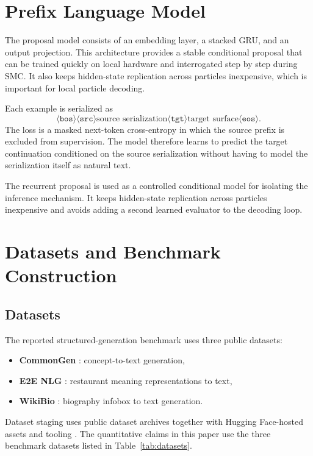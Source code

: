 \documentclass[11pt]{article}
\begin{document}
\section{Prefix Language Model}
The proposal model consists of an embedding layer, a stacked GRU, and an output projection. This architecture provides a stable conditional proposal that can be trained quickly on local hardware and interrogated step by step during SMC. It also keeps hidden-state replication across particles inexpensive, which is important for local particle decoding.

Each example is serialized as
\[
\langle \texttt{bos} \rangle
\langle \texttt{src} \rangle
\text{source serialization}
\langle \texttt{tgt} \rangle
\text{target surface}
\langle \texttt{eos} \rangle.
\]
The loss is a masked next-token cross-entropy in which the source prefix is excluded from supervision. The model therefore learns to predict the target continuation conditioned on the source serialization without having to model the serialization itself as natural text.

The recurrent proposal is used as a controlled conditional model for isolating the inference mechanism. It keeps hidden-state replication across particles inexpensive and avoids adding a second learned evaluator to the decoding loop.

\section{Datasets and Benchmark Construction}
\subsection{Datasets}
The reported structured-generation benchmark uses three public datasets:
\begin{itemize}[leftmargin=1.5em]
  \item \textbf{CommonGen} \citep{lin2020commongen}: concept-to-text generation,
  \item \textbf{E2E NLG} \citep{novikova2017e2e,dusek2019semantic,gehrmann2021gem}: restaurant meaning representations to text,
  \item \textbf{WikiBio} \citep{lebret2016generating}: biography infobox to text generation.
\end{itemize}
Dataset staging uses public dataset archives together with Hugging Face-hosted assets and tooling \citep{lhoest2021datasets}. The quantitative claims in this paper use the three benchmark datasets listed in Table~\ref{tab:datasets}.
\end{document}
